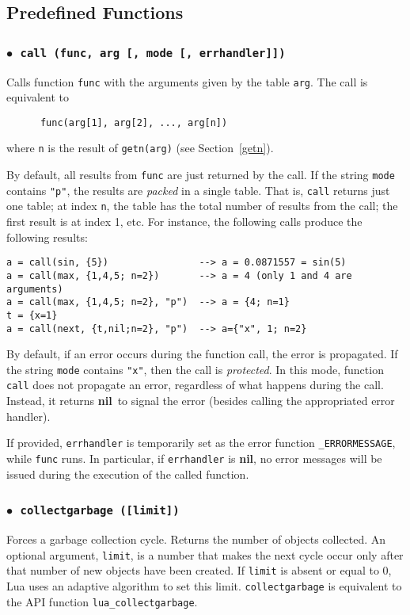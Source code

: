 \documentclass[11pt]{article}
\newcommand{\See}[1]{Section~\ref{#1}}
\newcommand{\see}[1]{(see \See{#1})}
\newcommand{\T}[1]{{\tt #1}}
\newcommand{\nil}{{\bf nil}}
\newcommand{\Deffunc}[1]{\index{#1}}
\newcommand{\ff}{$\bullet$\ }
\begin{document}
\subsection{Predefined Functions} \label{predefined}

\subsubsection*{\ff \T{call (func, arg [, mode [, errhandler]])}}\Deffunc{call}
\label{pdf-call}
Calls function \verb|func| with
the arguments given by the table \verb|arg|.
The call is equivalent to
\begin{verbatim}
      func(arg[1], arg[2], ..., arg[n])
\end{verbatim}
where \verb|n| is the result of \verb|getn(arg)| \see{getn}.

By default,
all results from \verb|func| are just returned by the call.
If the string \verb|mode| contains \verb|"p"|,
the results are \emph{packed} in a single table.
That is, \verb|call| returns just one table;
at index \verb|n|, the table has the total number of results
from the call;
the first result is at index 1, etc.
For instance, the following calls produce the following results:
\begin{verbatim}
a = call(sin, {5})                --> a = 0.0871557 = sin(5)
a = call(max, {1,4,5; n=2})       --> a = 4 (only 1 and 4 are arguments)
a = call(max, {1,4,5; n=2}, "p")  --> a = {4; n=1}
t = {x=1}
a = call(next, {t,nil;n=2}, "p")  --> a={"x", 1; n=2}
\end{verbatim}

By default,
if an error occurs during the function call,
the error is propagated.
If the string \verb|mode| contains \verb|"x"|,
then the call is \emph{protected}.
In this mode, function \verb|call| does not propagate an error,
regardless of what happens during the call.
Instead, it returns \nil\ to signal the error
(besides calling the appropriated error handler).

If provided,
\verb|errhandler| is temporarily set as the error function
\verb|_ERRORMESSAGE|, while \verb|func| runs.
In particular, if \verb|errhandler| is \nil,
no error messages will be issued during the execution of the called function.

\subsubsection*{\ff \T{collectgarbage ([limit])}}\Deffunc{collectgarbage}
Forces a garbage collection cycle.
Returns the number of objects collected.
An optional argument, \verb|limit|, is a number that
makes the next cycle occur only after that number of new
objects have been created.
If \verb|limit| is absent or equal to 0,
Lua uses an adaptive algorithm to set this limit.
\verb|collectgarbage| is equivalent to
the API function \verb|lua_collectgarbage|.
\end{document}
